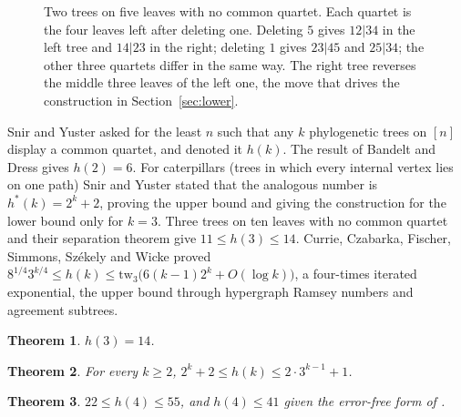 \documentclass[11pt]{amsart}
\newtheorem{theorem}{Theorem}[section]
\theoremstyle{definition}
\begin{document}
\begin{figure}[ht]
\centering
{}
\caption{Two trees on five leaves with no common quartet. Each quartet is the four leaves left after deleting one.
Deleting $5$ gives $12|34$ in the left tree and $14|23$ in the right; deleting $1$ gives $23|45$ and $25|34$; the
other three quartets differ in the same way. The right tree reverses the middle three leaves of the left one, the
move that drives the construction in Section~\ref{sec:lower}.}
\label{fig:five}
\end{figure}

Snir and Yuster \cite[\S5]{SY} asked for the least $n$ such that any $k$ phylogenetic trees on $[n]$ display a
common quartet, and denoted it $h(k)$. The result of Bandelt and Dress gives $h(2)=6$. For caterpillars (trees in
which every internal vertex lies on one path) Snir and Yuster stated that the analogous number is $h^*(k)=2^k+2$,
proving the upper bound and giving the construction for the lower bound only for $k=3$. Three trees on ten leaves
with no common quartet \cite[Figure~4]{SY} and their separation theorem \cite[Theorem~1.3]{SY} give
$11\le h(3)\le 14$. Currie, Czabarka, Fischer, Simmons, Sz\'ekely and Wicke \cite{CCFSSW} proved
$8^{1/4}3^{k/4}\le h(k)\le \mathrm{tw}_3\bigl(6(k-1)2^k+O(\log k)\bigr)$, a four-times iterated exponential, the
upper bound through hypergraph Ramsey numbers and agreement subtrees.

\begin{theorem}\label{thm:h3}
$h(3)=14$.
\end{theorem}

\begin{theorem}\label{thm:hk}
For every $k\ge 2$, \quad $2^k+2\le h(k)\le 2\cdot 3^{k-1}+1$.
\end{theorem}

\begin{theorem}\label{thm:h4}
$22\le h(4)\le 55$, and $h(4)\le 41$ given the error-free form of \cite[Theorem~1.3]{SY}.
\end{theorem}
\end{document}
